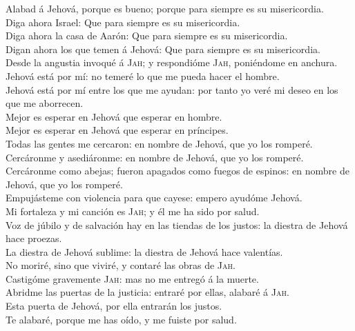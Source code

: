  Alabad á Jehová, porque es bueno; porque para siempre es
su misericordia.\\
 Diga ahora Israel: Que para siempre es su misericordia.\\
 Diga ahora la casa de Aarón: Que para siempre es su
misericordia.\\
 Digan ahora los que temen á Jehová: Que para siempre es
su misericordia.\\
 Desde la angustia invoqué á \textsc{Jah}; y respondióme
\textsc{Jah}, poniéndome en anchura.\\
 Jehová está por mí: no temeré lo que me pueda hacer el
hombre.\\
 Jehová está por mí entre los que me ayudan: por tanto yo
veré mi deseo en los que me aborrecen.\\
 Mejor es esperar en Jehová que esperar en hombre.\\
 Mejor es esperar en Jehová que esperar en príncipes.\\
 Todas las gentes me cercaron: en nombre de Jehová, que
yo los romperé.\\
 Cercáronme y asediáronme: en nombre de Jehová, que yo
los romperé.\\
 Cercáronme como abejas; fueron apagados como fuegos de
espinos: en nombre de Jehová, que yo los romperé.\\
 Empujásteme con violencia para que cayese: empero
ayudóme Jehová.\\
 Mi fortaleza y mi canción es \textsc{Jah}; y él me ha
sido por salud.\\
 Voz de júbilo y de salvación hay en las tiendas de los
justos: la diestra de Jehová hace proezas.\\
 La diestra de Jehová sublime: la diestra de Jehová hace
valentías.\\
 No moriré, sino que viviré, y contaré las obras de
\textsc{Jah}.\\
 Castigóme gravemente \textsc{Jah}: mas no me entregó á
la muerte.\\
 Abridme las puertas de la justicia: entraré por ellas,
alabaré á \textsc{Jah}.\\
 Esta puerta de Jehová, por ella entrarán los justos.\\
 Te alabaré, porque me has oído, y me fuiste por salud.\\
